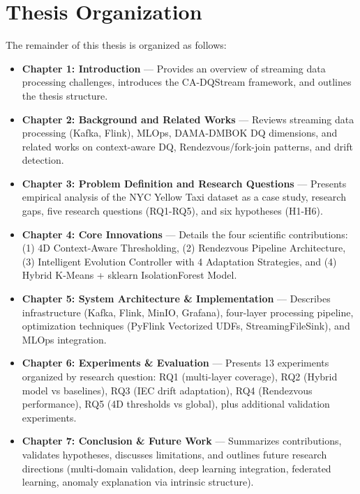 \section{Thesis Organization}
The remainder of this thesis is organized as follows:
\begin{itemize}
    \item \textbf{Chapter 1: Introduction} --- Provides an overview of streaming data processing challenges, introduces the CA-DQStream framework, and outlines the thesis structure.
    \item \textbf{Chapter 2: Background and Related Works} --- Reviews streaming data processing (Kafka, Flink), MLOps, DAMA-DMBOK DQ dimensions, and related works on context-aware DQ, Rendezvous/fork-join patterns, and drift detection.
    \item \textbf{Chapter 3: Problem Definition and Research Questions} --- Presents empirical analysis of the NYC Yellow Taxi dataset as a case study, research gaps, five research questions (RQ1-RQ5), and six hypotheses (H1-H6).
    \item \textbf{Chapter 4: Core Innovations} --- Details the four scientific contributions: (1) 4D Context-Aware Thresholding, (2) Rendezvous Pipeline Architecture, (3) Intelligent Evolution Controller with 4 Adaptation Strategies, and (4) Hybrid K-Means + sklearn IsolationForest Model.
    \item \textbf{Chapter 5: System Architecture \& Implementation} --- Describes infrastructure (Kafka, Flink, MinIO, Grafana), four-layer processing pipeline, optimization techniques (PyFlink Vectorized UDFs, StreamingFileSink), and MLOps integration.
    \item \textbf{Chapter 6: Experiments \& Evaluation} --- Presents 13 experiments organized by research question: RQ1 (multi-layer coverage), RQ2 (Hybrid model vs baselines), RQ3 (IEC drift adaptation), RQ4 (Rendezvous performance), RQ5 (4D thresholds vs global), plus additional validation experiments.
    \item \textbf{Chapter 7: Conclusion \& Future Work} --- Summarizes contributions, validates hypotheses, discusses limitations, and outlines future research directions (multi-domain validation, deep learning integration, federated learning, anomaly explanation via intrinsic structure).
\end{itemize}
